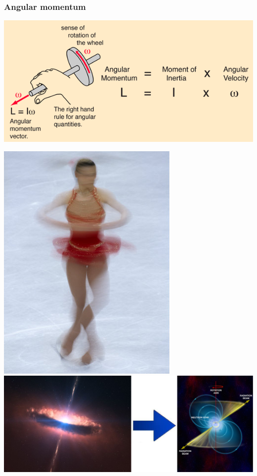 \documentclass[compress]{beamer}
\begin{document}
\begin{frame}
\frametitle{Angular momentum}
\begin{center}
\includegraphics[width=0.6\linewidth]{angular_momentum.png}
\end{center}

\includegraphics[height=3 cm]{spinning_skater.jpg} \hfill
\includegraphics[height=3 cm]{accretion_disk_to_pulsar.png}
\end{frame}
\end{document}

